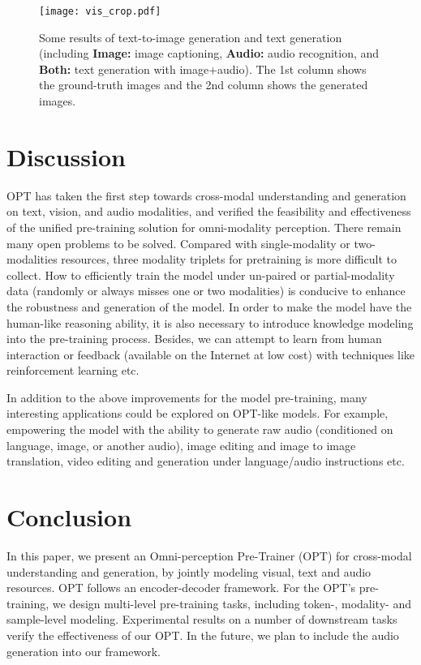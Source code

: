 \documentclass[10pt,twocolumn,letterpaper]{article}
\begin{document}
\begin{figure*}[t]
\begin{center}
\texttt{[image: vis\_crop.pdf]}
\end{center}
  \caption{Some results of text-to-image generation and text generation (including \textbf{Image:} image captioning, \textbf{Audio:} audio recognition, and \textbf{Both:} text generation with image+audio). The 1st column shows the ground-truth images and the 2nd column shows the generated images.}
\label{fig:vis}
\end{figure*}

\section{Discussion}
OPT has taken the first step towards cross-modal understanding and generation on text, vision, and audio modalities, and verified the feasibility and effectiveness of the unified pre-training solution for omni-modality perception. There remain many open problems to be solved. Compared with single-modality or two-modalities resources, three modality triplets for pretraining is more difficult to collect. How to efficiently train the model under un-paired  or partial-modality data (randomly or always misses one or two modalities) is conducive to enhance the robustness and generation of the model. In order to make the model have the human-like reasoning ability, it is also necessary to introduce knowledge modeling into the pre-training process. Besides, we can attempt to learn from human interaction or feedback (available on the Internet at low cost) with techniques like reinforcement learning etc. 
 
In addition to the above improvements for the model pre-training, many interesting applications could be explored on OPT-like models. For example, empowering the model with the ability to generate raw audio (conditioned on language, image, or another audio), image editing and image to image translation, video editing and generation under language/audio instructions etc. 

\section{Conclusion}
In this paper, we present an Omni-perception Pre-Trainer (OPT) for cross-modal understanding and generation, by jointly modeling visual, text and audio resources. OPT follows an encoder-decoder framework. For the OPT's pre-training, we design multi-level pre-training tasks, including token-, modality- and sample-level modeling. Experimental results on a number of downstream tasks verify the effectiveness of our OPT. In the future, we plan to include the audio generation into our framework. 


{\small


}
\end{document}
